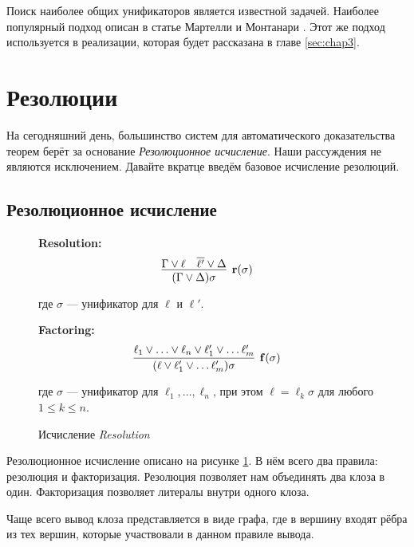 Поиск наиболее общих унификаторов является известной задачей. Наиболее популярный подход описан в статье Мартелли и Монтанари \cite{Martelli:1982:EUA:357162.357169}. Этот же подход используется в реализации, которая будет рассказана в главе \ref{sec:chap3}.

\section{Резолюции}

На сегодняшний день, большинство систем для автоматического доказательства теорем берёт за основание \emph{Резолюционное исчисление}. Наши рассуждения не являются исключением. Давайте вкратце введём базовое исчисление резолюций.

\subsection{Резолюционное исчисление}
\begin{figure}
\begin{calculus}
\centering
\textbf{Resolution:}
$$
\infer[\mathbf{r}(\sigma)]
	  {(\Gamma \vee \Delta)\sigma}
      {\Gamma \vee \ell & \overline{\ell'} \vee \Delta}
$$

где $\sigma$ --- унификатор для $\ell$ и $\ell'$.

\bigskip

\textbf{Factoring:}
$$
\infer[\mathbf{f}(\sigma)]
      {(\ell \vee \ell'_1 \vee \ldots \ell'_m)\sigma}
      {\ell_1 \vee \ldots \vee \ell_n \vee \ell'_1 \vee \ldots \ell'_m}
$$

где $\sigma$ --- унификатор для $\ell_1, \ldots, \ell_n$, при этом $\ell = \ell_k \sigma$ для любого $1 \leq k \leq n$.
\end{calculus}
\caption{Исчисление \emph{Resolution}}
\label{fig:R}
\end{figure}

Резолюционное исчисление описано на рисунке \ref{fig:R}. В нём всего два правила: резолюция и факторизация. Резолюция позволяет нам объединять два клоза в один. Факторизация позволяет  литералы внутри одного клоза.

Чаще всего вывод клоза представляется в виде графа, где в вершину входят рёбра из тех вершин, которые участвовали в данном правиле вывода. 

